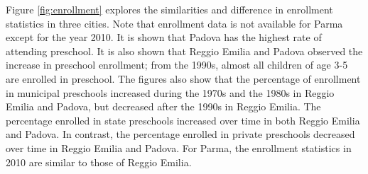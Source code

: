 Figure \ref{fig:enrollment} explores the similarities and difference in enrollment statistics in three cities. Note that enrollment data is not available for Parma except for the year 2010. It is shown that Padova has the highest rate of attending preschool. It is also shown that Reggio Emilia and Padova observed the increase in preschool enrollment; from the 1990s, almost all children of age 3-5 are enrolled in preschool. The figures also show that the percentage of enrollment in municipal preschools increased during the 1970s and the 1980s in Reggio Emilia and Padova, but decreased after the 1990s in Reggio Emilia. The percentage enrolled in state preschools increased over time in both Reggio Emilia and Padova. In contrast, the percentage enrolled in private preschools decreased over time in Reggio Emilia and Padova. For Parma, the enrollment statistics in 2010 are similar to those of Reggio Emilia. 
 
